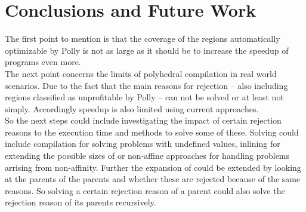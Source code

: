 \chapter{Conclusions and Future Work}
The first point to mention is that the coverage of the regions automatically optimizable by Polly is not as large as it should be to increase the speedup of programs even more.\\
The next point concerns the limits of polyhedral compilation in real world scenarios.
Due to the fact that the main reasons for rejection -- also including regions classified as unprofitable by Polly -- can not be solved or at least not simply.
Accordingly speedup is also limited using current approaches.\\
So the next steps could include investigating the impact of certain rejection reasons to the execution time and methods to solve some of these.
Solving could include \jit compilation for solving problems with undefined values, inlining for extending the possible sizes of \scops or non-affine approaches for handling problems arrising from non-affinity.
Further the expansion of \scops could be extended by looking at the parents of the parents and whether these are rejected because of the same reasons.
So solving a certain rejection reason of a parent could also solve the rejection reason of its parents recursively.
